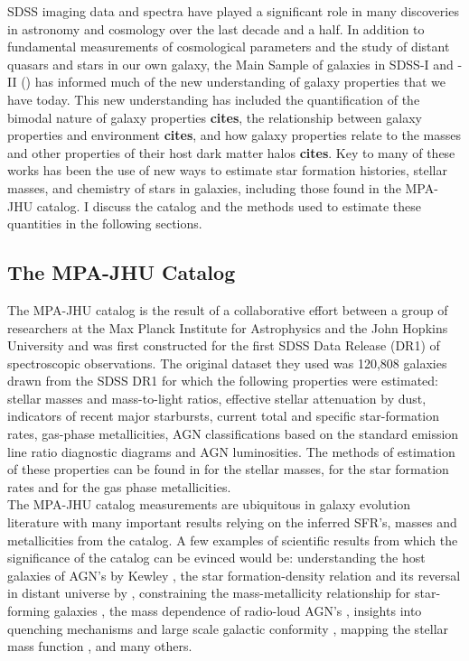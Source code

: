 SDSS imaging data and spectra have played a significant role in many discoveries in astronomy and cosmology over the last decade and a half. In addition to fundamental measurements of cosmological parameters and the study of distant quasars and stars in our own galaxy, the Main Sample of galaxies in SDSS-I and -II (\citet{strauss02a}) has informed much of the new understanding of galaxy properties that we have today. This 
new understanding has included the quantification of the 
bimodal nature of galaxy properties {\bf cites}, the relationship
between galaxy properties and environment {\bf cites}, and
how galaxy properties relate to the masses and other properties
of their host dark matter halos {\bf cites}. Key to many 
of these  works has been the use of new ways to estimate
star formation histories, stellar masses, and chemistry of 
stars in galaxies, including those found in the MPA-JHU 
catalog.
I discuss the catalog and the methods used to estimate these quantities in the following sections.\\

\subsection{The MPA-JHU Catalog}

The MPA-JHU catalog is the result of a collaborative effort between a group of researchers at the Max Planck Institute for Astrophysics and the John Hopkins University and was first constructed for the first SDSS Data Release (DR1) of spectroscopic observations. The original dataset they used was 120,808 galaxies drawn from the SDSS DR1 for which the following properties were estimated: stellar masses and mass-to-light ratios, effective stellar attenuation by dust, indicators of recent major starbursts, current total and specific star-formation rates, gas-phase metallicities, AGN classifications based on the standard emission line ratio diagnostic diagrams and AGN luminosities. The methods of estimation of these properties can be found in \citet{kauffmann_stellar_2003} for the stellar masses, \citet{brinchmann_physical_2004} for the star formation rates and \citet{tremonti_origin_2004} for the gas phase metallicities.\\

The MPA-JHU catalog measurements are ubiquitous in galaxy evolution literature with many important results relying on the inferred SFR's, masses and metallicities from the catalog. A few examples of scientific results from which the significance of the catalog can be evinced would be: understanding the host galaxies of AGN's by Kewley \citep{kewley2006}, the star formation-density relation and its reversal in distant universe by \citet{elbaz2007}, constraining the mass-metallicity relationship for star-forming galaxies \citep{kewley2008}, the mass dependence of radio-loud AGN's \citep{best05a}, insights into quenching mechanisms \citep{peng_mass_2010} and large scale galactic conformity \citep{kauffmann2013}, mapping the stellar mass function \citep{2009MNRAS.398.2177L, 2015MNRAS.454.4027D}, and many others.\\

